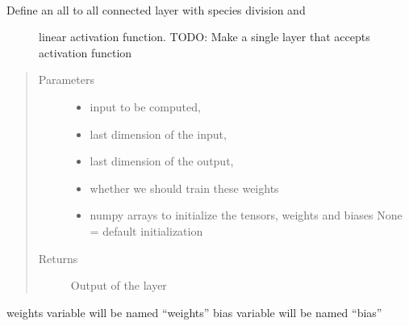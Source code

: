 \documentclass[letterpaper,10pt,english]{sphinxmanual}
\begin{document}

\begin{fulllineitems}
\label{\detokenize{neuralnet/layers:layers.hidden_layer_linear}}~\begin{description}
\item[{Define an all to all connected layer with species division and}] \leavevmode
linear activation function.
TODO: Make a single layer that accepts activation function

\end{description}
\begin{quote}\begin{description}
\item[{Parameters}] \leavevmode\begin{itemize}
\item {} 
 \textendash{} input to be computed,

\item {} 
 \textendash{} last dimension of the input,

\item {} 
 \textendash{} last dimension of the output,

\item {} 
 \textendash{} whether we should train these weights

\item {} 
 \textendash{} numpy arrays to initialize the tensors, weights and biases
None = default initialization

\end{itemize}

\item[{Returns}] \leavevmode
Output of the layer

\end{description}\end{quote}

weights variable will be named “weights”
bias variable will be named “bias”

\end{fulllineitems}
\end{document}
